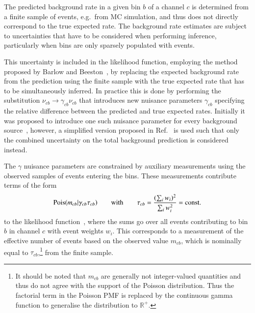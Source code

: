 The predicted background rate in a given bin $b$ of a channel $c$ is determined
from a finite sample of events, e.g.\ from MC simulation, and thus does not
directly correspond to the true expected rate. The background rate estimates are
subject to uncertainties that have to be considered when performing inference,
particularly when bins are only sparsely populated with events.

This uncertainty is included in the likelihood function, employing the method
proposed by Barlow and Beeston~\cite{barlow1993}, by replacing the expected
background rate from the prediction using the finite sample with the true
expected rate that has to be simultaneously inferred. In practice this is done
by performing the substitution $\nu_{cb} \rightarrow \gamma_{cb} \nu_{cb}$ that
introduces new nuisance parameters $\gamma_{cb}$ specifying the relative
difference between the predicted and true expected rates. Initially it was
proposed to introduce one such nuisance parameter for every background
source~\cite{barlow1993}, however, a simplified version proposed in
Ref.~\cite{conway2011} is used such that only the combined uncertainty on the
total background prediction is considered instead.

The $\gamma$ nuisance parameters are constrained by auxiliary measurements using
the observed samples of events entering the bins. These measurements contribute
terms of the form
\begin{align*}
  \operatorname{Pois}(m_{cb} | \gamma_{cb} \tau_{cb})
  \qquad \text{with} \qquad
  \tau_{cb} = \frac{( \sum_i w_i )^2}{\sum_i w_i^2} = \text{const.}
\end{align*}
to the likelihood function~\cite{cranmer2012}, where the sums go over all events
contributing to bin $b$ in channel $c$ with event weights $w_i$. This
corresponds to a measurement of the effective number of events based on the
observed value $m_{cb}$, which is nominally equal to $\tau_{cb}$,\footnote{It
  should be noted that $m_{cb}$ are generally not integer-valued quantities and
  thus do not agree with the support of the Poisson distribution. Thus the
  factorial term in the Poisson PMF is replaced by the continuous gamma function
  to generalise the distribution to $\mathbb{R}^+$.} from the finite sample.

